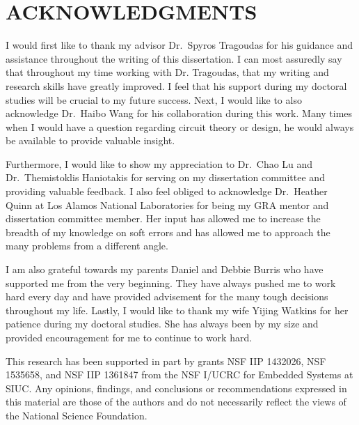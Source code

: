 


\chapter*{ACKNOWLEDGMENTS}

I would first like to thank my advisor Dr.\ Spyros Tragoudas for his guidance and assistance throughout the writing of this dissertation. I can most assuredly say that throughout my time working with Dr. Tragoudas, that my writing and research skills have greatly improved. I feel that his support during my doctoral studies will be crucial to my future success. Next, I would like to also acknowledge Dr.\ Haibo Wang for his collaboration during this work. Many times when I would have a question regarding circuit theory or design, he would always be available to provide valuable insight.

Furthermore, I would like to show my appreciation to Dr.\ Chao Lu and Dr.\ Themistoklis Haniotakis for serving on my dissertation committee and providing valuable feedback. I also feel obliged to acknowledge Dr.\ Heather Quinn at Los Alamos National Laboratories for being my GRA mentor and dissertation committee member. Her input has allowed me to increase the breadth of my knowledge on soft errors and has allowed me to approach the many problems from a different angle. 

I am also grateful towards my parents Daniel and Debbie Burris who have supported me from the very beginning. They have always pushed me to work hard every day and have provided advisement for the many tough decisions throughout my life. Lastly, I would like to thank my wife Yijing Watkins for her patience during my doctoral studies. She has always been by my size and provided encouragement for me to continue to work hard. 

This research has been supported in part by grants NSF IIP 1432026, NSF 1535658, and NSF IIP 1361847 from the NSF I/UCRC for Embedded Systems at SIUC. Any opinions, findings, and conclusions or recommendations expressed in this material are those of the authors and do not necessarily reflect the views of the National Science Foundation.
 
\newpage
